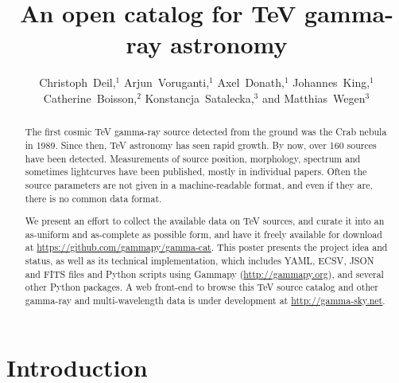 \documentclass[11pt,twoside]{article}
\begin{document}
\title{An open catalog for TeV gamma-ray astronomy}

\author{Christoph~Deil,$^1$
Arjun~Voruganti,$^1$
Axel~Donath,$^1$
Johannes~King,$^1$
Catherine~Boisson,$^2$
Konstancja~Satalecka,$^3$
and Matthias~Wegen$^3$
}


\begin{abstract}

The first cosmic TeV gamma-ray source detected from the ground was the Crab
nebula in 1989. Since then, TeV astronomy has seen rapid growth. By now, over
160 sources have been detected. Measurements of source position, morphology,
spectrum and sometimes lightcurves have been published, mostly in individual
papers. Often the source parameters are not given in a machine-readable format,
and even if they are, there is no common data format.

We present an effort to collect the available data on TeV sources, and curate it
into an as-uniform and as-complete as possible form, and have it freely
available for download at \url{https://github.com/gammapy/gamma-cat}. This
poster presents the project idea and status, as well as its technical
implementation, which includes YAML, ECSV, JSON and FITS files and Python
scripts using Gammapy (\url{http://gammapy.org}), and several other Python
packages. A web front-end to browse this TeV source catalog and other gamma-ray
and multi-wavelength data is under development at \url{http://gamma-sky.net}.

\end{abstract}

\section{Introduction}
\end{document}
